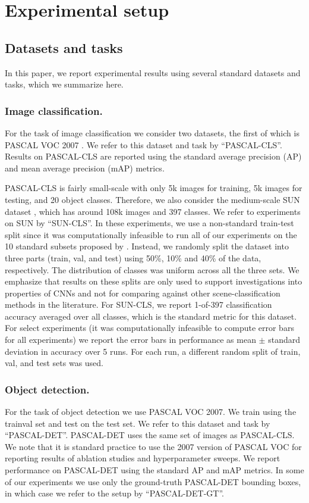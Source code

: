 \section{Experimental setup}
\label{sec:train}

\subsection{Datasets and tasks}
In this paper, we report experimental results using several standard datasets and tasks, which we summarize here.

\subsubsection{Image classification.} For the task of image classification we consider two datasets, the first of which is PASCAL VOC 2007 \cite{Pascal}.
We refer to this dataset and task by ``PASCAL-CLS''.
Results on PASCAL-CLS are reported using the standard average precision (AP) and mean average precision (mAP) metrics.

PASCAL-CLS is fairly small-scale with only 5k images for training, 5k images for testing, and 20 object classes.
Therefore, we also consider the medium-scale SUN dataset \cite{sun}, which has around 108k images and 397 classes.
We refer to experiments on SUN by ``SUN-CLS''.
In these experiments, we use a non-standard train-test split since it was computationally infeasible to run all of our experiments on the 10 standard subsets proposed by \cite{sun}. 
Instead, we randomly split the dataset into three parts (train, val, and test) using 50\%, 10\% and 40\% of the data, respectively. 
The distribution of classes was uniform across all the three sets.
We emphasize that results on these splits are only used to support investigations into properties of CNNs and not for comparing against other scene-classification methods in the literature.
For SUN-CLS, we report 1-of-397 classification accuracy averaged over all classes, which is the standard metric for this dataset.
For select experiments (it was computationally infeasible to compute error bars for all experiments) we report the error bars in performance as mean $\pm$ standard deviation in accuracy over 5 runs. For each run, a different random split of train, val, and test sets was used.  

\subsubsection{Object detection.} For the task of object detection we use PASCAL VOC 2007.
We train using the trainval set and test on the test set.
We refer to this dataset and task by ``PASCAL-DET''.
PASCAL-DET uses the same set of images as PASCAL-CLS.
We note that it is standard practice to use the 2007 version of PASCAL VOC for reporting results of ablation studies and hyperparameter sweeps.
We report performance on PASCAL-DET using the standard AP and mAP metrics.
In some of our experiments we use only the ground-truth PASCAL-DET bounding boxes, in which case we refer to the setup by ``PASCAL-DET-GT''.

